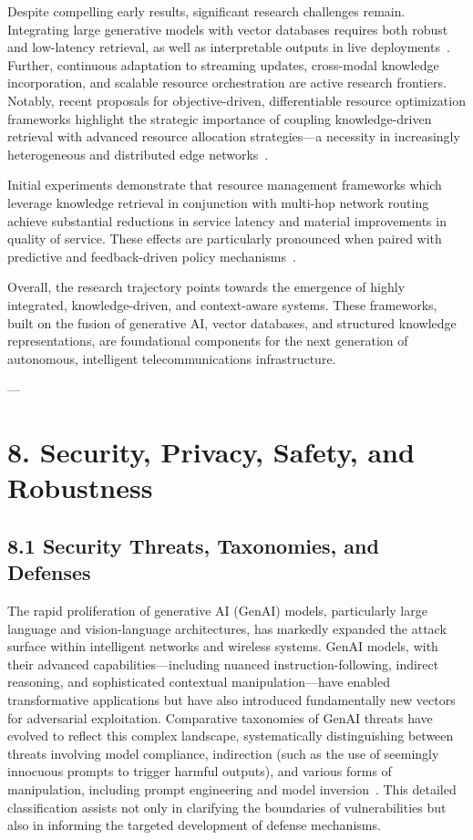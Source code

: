 \documentclass[11pt]{article}
\begin{document}
Despite compelling early results, significant research challenges remain. Integrating large generative models with vector databases requires both robust and low-latency retrieval, as well as interpretable outputs in live deployments~\cite{ref20, ref21}. Further, continuous adaptation to streaming updates, cross-modal knowledge incorporation, and scalable resource orchestration are active research frontiers. Notably, recent proposals for objective-driven, differentiable resource optimization frameworks highlight the strategic importance of coupling knowledge-driven retrieval with advanced resource allocation strategies---a necessity in increasingly heterogeneous and distributed edge networks~\cite{ref48}.

Initial experiments demonstrate that resource management frameworks which leverage knowledge retrieval in conjunction with multi-hop network routing achieve substantial reductions in service latency and material improvements in quality of service. These effects are particularly pronounced when paired with predictive and feedback-driven policy mechanisms~\cite{ref48}.

Overall, the research trajectory points towards the emergence of highly integrated, knowledge-driven, and context-aware systems. These frameworks, built on the fusion of generative AI, vector databases, and structured knowledge representations, are foundational components for the next generation of autonomous, intelligent telecommunications infrastructure.

---
\section{8. Security, Privacy, Safety, and Robustness}

\subsection{8.1 Security Threats, Taxonomies, and Defenses}

The rapid proliferation of generative AI (GenAI) models, particularly large language and vision-language architectures, has markedly expanded the attack surface within intelligent networks and wireless systems. GenAI models, with their advanced capabilities—including nuanced instruction-following, indirect reasoning, and sophisticated contextual manipulation—have enabled transformative applications but have also introduced fundamentally new vectors for adversarial exploitation. Comparative taxonomies of GenAI threats have evolved to reflect this complex landscape, systematically distinguishing between threats involving model compliance, indirection (such as the use of seemingly innocuous prompts to trigger harmful outputs), and various forms of manipulation, including prompt engineering and model inversion~\cite{ref3}. This detailed classification assists not only in clarifying the boundaries of vulnerabilities but also in informing the targeted development of defense mechanisms.
\end{document}
